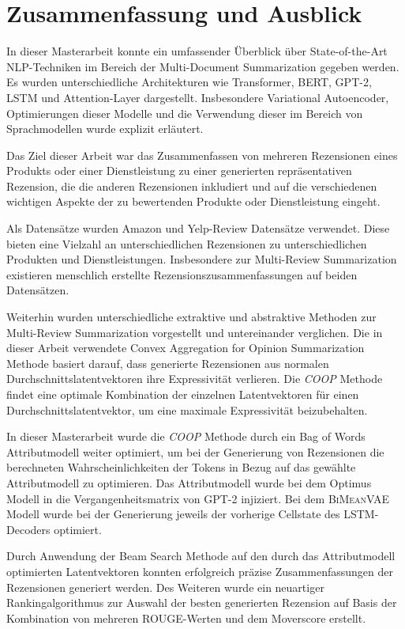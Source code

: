 \section{Zusammenfassung und Ausblick}\raggedbottom
\label{summary}
In dieser Masterarbeit konnte ein umfassender Überblick über State-of-the-Art NLP-Techniken im Bereich der Multi-Document Summarization gegeben werden.
Es wurden unterschiedliche Architekturen wie Transformer, BERT, GPT-2, LSTM und Attention-Layer dargestellt. 
Insbesondere Variational Autoencoder, Optimierungen dieser Modelle und die Verwendung dieser im Bereich von Sprachmodellen wurde explizit erläutert.

Das Ziel dieser Arbeit war das Zusammenfassen von mehreren Rezensionen eines Produkts oder einer Dienstleistung zu einer generierten repräsentativen Rezension, die die anderen Rezensionen inkludiert und auf die verschiedenen wichtigen Aspekte der zu bewertenden Produkte oder Dienstleistung eingeht.

Als Datensätze wurden Amazon und Yelp-Review Datensätze verwendet. Diese bieten eine Vielzahl an unterschiedlichen Rezensionen zu unterschiedlichen Produkten und Dienstleistungen. Insbesondere zur Multi-Review Summarization existieren menschlich erstellte Rezensionszusammenfassungen auf beiden Datensätzen.

Weiterhin wurden unterschiedliche extraktive und abstraktive Methoden zur Multi-Review Summarization vorgestellt und untereinander verglichen. 
Die in dieser Arbeit verwendete Convex Aggregation for Opinion Summarization Methode basiert darauf, dass generierte Rezensionen aus normalen Durchschnittslatentvektoren ihre Expressivität verlieren. 
Die \textit{COOP} Methode findet eine optimale Kombination der einzelnen Latentvektoren für einen Durchschnittslatentvektor, um eine maximale Expressivität beizubehalten.

In dieser Masterarbeit wurde die \textit{COOP} Methode durch ein Bag of Words Attributmodell weiter optimiert, um bei der Generierung von Rezensionen die berechneten Wahrscheinlichkeiten der Tokens in Bezug auf das gewählte Attributmodell zu optimieren.
Das Attributmodell wurde bei dem Optimus Modell in die Vergangenheitsmatrix von GPT-2 injiziert. Bei dem \textsc{BiMeanVAE} Modell wurde bei der Generierung jeweils der vorherige Cellstate des LSTM-Decoders optimiert.

Durch Anwendung der Beam Search Methode auf den durch das Attributmodell optimierten Latentvektoren konnten erfolgreich präzise Zusammenfassungen der Rezensionen generiert werden.
Des Weiteren wurde ein neuartiger Rankingalgorithmus zur Auswahl der besten generierten Rezension auf Basis der Kombination von mehreren ROUGE-Werten und dem Moverscore erstellt.

